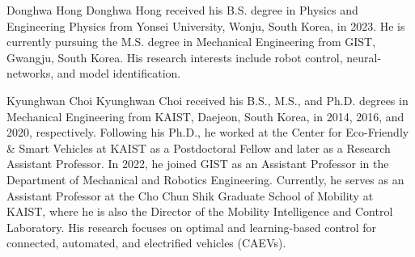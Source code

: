 \documentclass[lettersize,journal]{IEEEtran}
\newcommand*{\template}{template}
\begin{document}
\begin{IEEEbiography}{Donghwa Hong}
    Donghwa Hong received his B.S. degree in Physics and Engineering Physics from Yonsei University, Wonju, South Korea, in 2023. He is currently pursuing the M.S. degree in Mechanical Engineering from GIST, Gwangju, South Korea.  
His research interests include robot control, neural-networks, and model identification. 
\end{IEEEbiography}

\begin{IEEEbiography}{Kyunghwan Choi}
    Kyunghwan Choi received his B.S., M.S., and Ph.D. degrees in Mechanical Engineering from KAIST, Daejeon, South Korea, in 2014, 2016, and 2020, respectively. Following his Ph.D., he worked at the Center for Eco-Friendly \& Smart Vehicles at KAIST as a Postdoctoral Fellow and later as a Research Assistant Professor. In 2022, he joined GIST as an Assistant Professor in the Department of Mechanical and Robotics Engineering. Currently, he serves as an Assistant Professor at the Cho Chun Shik Graduate School of Mobility at KAIST, where he is also the Director of the Mobility Intelligence and Control Laboratory. His research focuses on optimal and learning-based control for connected, automated, and electrified vehicles (CAEVs).
\end{IEEEbiography}
\end{document}
